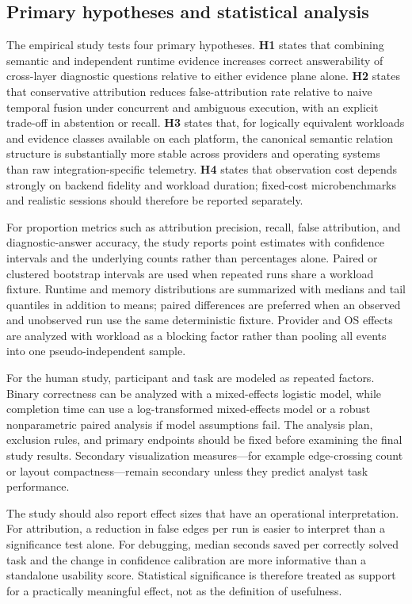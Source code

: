 \subsection{Primary hypotheses and statistical analysis}
The empirical study tests four primary hypotheses. \textbf{H1} states that combining semantic and independent runtime evidence increases correct answerability of cross-layer diagnostic questions relative to either evidence plane alone. \textbf{H2} states that conservative attribution reduces false-attribution rate relative to naive temporal fusion under concurrent and ambiguous execution, with an explicit trade-off in abstention or recall. \textbf{H3} states that, for logically equivalent workloads and evidence classes available on each platform, the canonical semantic relation structure is substantially more stable across providers and operating systems than raw integration-specific telemetry. \textbf{H4} states that observation cost depends strongly on backend fidelity and workload duration; fixed-cost microbenchmarks and realistic sessions should therefore be reported separately.

For proportion metrics such as attribution precision, recall, false attribution, and diagnostic-answer accuracy, the study reports point estimates with confidence intervals and the underlying counts rather than percentages alone. Paired or clustered bootstrap intervals are used when repeated runs share a workload fixture. Runtime and memory distributions are summarized with medians and tail quantiles in addition to means; paired differences are preferred when an observed and unobserved run use the same deterministic fixture. Provider and OS effects are analyzed with workload as a blocking factor rather than pooling all events into one pseudo-independent sample.

For the human study, participant and task are modeled as repeated factors. Binary correctness can be analyzed with a mixed-effects logistic model, while completion time can use a log-transformed mixed-effects model or a robust nonparametric paired analysis if model assumptions fail. The analysis plan, exclusion rules, and primary endpoints should be fixed before examining the final study results. Secondary visualization measures---for example edge-crossing count or layout compactness---remain secondary unless they predict analyst task performance.

The study should also report effect sizes that have an operational interpretation. For attribution, a reduction in false edges per run is easier to interpret than a significance test alone. For debugging, median seconds saved per correctly solved task and the change in confidence calibration are more informative than a standalone usability score. Statistical significance is therefore treated as support for a practically meaningful effect, not as the definition of usefulness.


